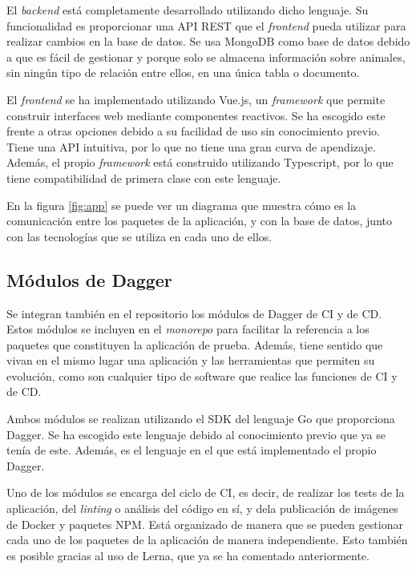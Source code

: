 El \textit{backend} está completamente desarrollado utilizando dicho lenguaje. Su funcionalidad es proporcionar una API REST que el \textit{frontend} pueda utilizar para realizar cambios en la base de datos. Se usa MongoDB\cite{mongodb} como base de datos debido a que es fácil de gestionar y porque solo se almacena información sobre animales, sin ningún tipo de relación entre ellos, en una única tabla o documento.

El \textit{frontend} se ha implementado utilizando Vue.js\cite{vue}, un \textit{framework} que permite construir interfaces web mediante componentes reactivos. Se ha escogido este frente a otras opciones debido a su facilidad de uso sin conocimiento previo. Tiene una API intuitiva, por lo que no tiene una gran curva de apendizaje. Además, el propio \textit{framework} está construido utilizando Typescript, por lo que tiene compatibilidad de primera clase con este lenguaje.

En la figura \ref{fig:app} se puede ver un diagrama que muestra cómo es la comunicación entre los paquetes de la aplicación, y con la base de datos, junto con las tecnologías que se utiliza en cada uno de ellos.

\subsection*{Módulos de Dagger}

Se integran también en el repositorio los módulos de Dagger de CI y de CD. Estos módulos se incluyen en el \textit{monorepo} para facilitar la referencia a los paquetes que constituyen la aplicación de prueba. Además, tiene sentido que vivan en el mismo lugar una aplicación y las herramientas que permiten su evolución, como son cualquier tipo de software que realice las funciones de CI y de CD.

Ambos módulos se realizan utilizando el SDK del lenguaje Go que proporciona Dagger. Se ha escogido este lenguaje debido al conocimiento previo que ya se tenía de este. Además, es el lenguaje en el que está implementado el propio Dagger.

Uno de los módulos se encarga del ciclo de CI, es decir, de realizar los tests de la aplicación, del \textit{linting} o análisis del código en sí, y dela publicación de imágenes de Docker y paquetes NPM. Está organizado de manera que se pueden gestionar cada uno de los paquetes de la aplicación de manera independiente. Esto también es posible gracias al uso de Lerna, que ya se ha comentado anteriormente.

